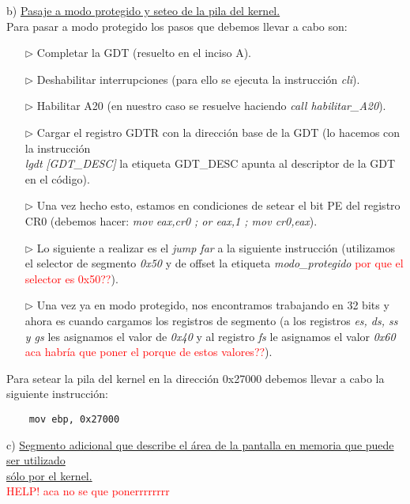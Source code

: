 \documentclass[a4paper]{article}
\begin{document}
{\large b)} \underline{Pasaje a modo protegido y seteo de la pila del kernel.}\\

Para pasar a modo protegido los pasos que debemos llevar a cabo son:


\begin{itemize}
\item[$\triangleright$] Completar la GDT (resuelto en el inciso A).
\item[$\triangleright$] Deshabilitar interrupciones (para ello se ejecuta la instrucci\'on \emph{cli}).
\item[$\triangleright$] Habilitar A20 (en nuestro caso se resuelve haciendo \emph{call habilitar_A20}).
\item[$\triangleright$] Cargar el registro GDTR con la direcci\'on base de la GDT (lo hacemos con la instrucci\'on  \\ \emph{lgdt} \emph{ [GDT_DESC]} la etiqueta GDT_DESC apunta al descriptor de la GDT en el c\'odigo).
\item[$\triangleright$] Una vez hecho esto, estamos en condiciones de setear el bit PE del registro CR0 (debemos hacer: \emph{mov eax,cr0 ; or eax,1 ; mov cr0,eax}).
\item[$\triangleright$] Lo siguiente a realizar es el \emph{jump far} a la siguiente instrucci\'on (utilizamos el selector de segmento \emph{0x50} y de offset la etiqueta \emph{modo_protegido} \textcolor{red}{por que el selector es 0x50??}).
\item[$\triangleright$] Una vez ya en modo protegido, nos encontramos trabajando en 32 bits y ahora es cuando cargamos los registros de segmento (a los registros  \emph{es, ds, ss y gs} les asignamos el valor de \emph{0x40} y al registro \emph{fs} le asignamos el valor \emph{0x60} \textcolor{red}{aca habr\'ia que poner el porque de estos valores??}).
\end{itemize}
 \bigskip	
Para setear la pila del kernel en la direcci\'on 0x27000 debemos llevar a cabo la siguiente instrucci\'on: 
\begin{codesnippet}
\begin{verbatim}
    mov ebp, 0x27000
\end{verbatim}
\end{codesnippet}

{\large c)} \underline{Segmento adicional que describe el \'area de la pantalla en memoria que puede ser utilizado} \\ \underline{s\'olo por el kernel.}
\\
\textcolor{red}{HELP! aca no se que ponerrrrrrrr}
\end{document}
